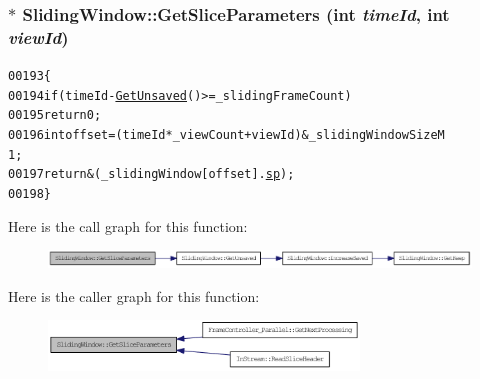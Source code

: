 \hypertarget{class_sliding_window_a020d2c25f1bda31337f91bf9b1a809d1}{
\subsubsection[{GetSliceParameters}]{$\ast$ SlidingWindow::GetSliceParameters (int {\em timeId}, \/  int {\em viewId})}}
\label{class_sliding_window_a020d2c25f1bda31337f91bf9b1a809d1}




\begin{footnotesize}\begin{alltt}
00193         \{
00194                 \textcolor{keywordflow}{if} (timeId - \hyperlink{class_sliding_window_a3df64e20282ce10a45c4c3f3011e536d}{GetUnsaved}() >= \_slidingFrameCount)
00195                         \textcolor{keywordflow}{return} 0;
00196                 \textcolor{keywordtype}{int} offset = (timeId * \_viewCount + viewId) & \_slidingWindowSizeM
      1;
00197                 \textcolor{keywordflow}{return} &(\_slidingWindow[offset].\hyperlink{structtag_sliding_item_a56c9f0817a904f6257d5de4e28c28724}{sp});
00198         \}
\end{alltt}\end{footnotesize}




Here is the call graph for this function:\nopagebreak
\begin{figure}[H]
\begin{center}
\leavevmode
\includegraphics[width=371pt]{class_sliding_window_a020d2c25f1bda31337f91bf9b1a809d1_cgraph}
\end{center}
\end{figure}




Here is the caller graph for this function:\nopagebreak
\begin{figure}[H]
\begin{center}
\leavevmode
\includegraphics[width=234pt]{class_sliding_window_a020d2c25f1bda31337f91bf9b1a809d1_icgraph}
\end{center}
\end{figure}


